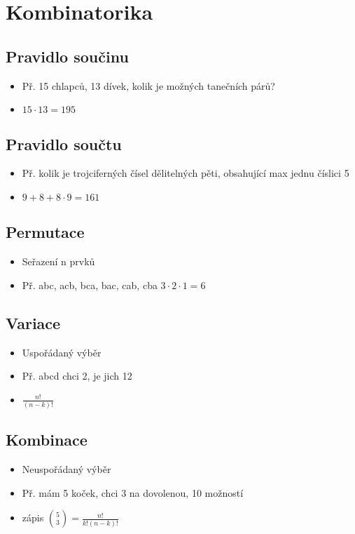 

\section{Kombinatorika} 
    \subsection{Pravidlo součinu} 
    \begin{itemize}
        \item Př. 15 chlapců, 13 dívek, kolik je možných tanečních párů?
        \item $15\cdot 13=195$
    \end{itemize}
    \subsection{Pravidlo součtu}
    \begin{itemize}
        \item Př. kolik je trojciferných čísel dělitelných pěti, obsahující 
        max jednu číslici 5
        \item $9+8+8\cdot 9 = 161$
    \end{itemize}
    \subsection{Permutace}
        \begin{itemize}
            \item Seřazení n prvků
            \item Př. abc, acb, bca, bac, cab, cba  $3\cdot 2\cdot 1=6$
        \end{itemize}
    \subsection{Variace}
        \begin{itemize}
            \item Uspořádaný výběr
            \item Př. abcd chci 2, je jich 12
            \item $\frac{n!}{(n-k)!}$
        \end{itemize}
    \subsection{Kombinace}
        \begin{itemize}
            \item Neuspořádaný výběr
            \item Př. mám 5 koček, chci 3 na dovolenou, 10 možností
            \item zápis ${5\choose 3}=\frac{n!}{k!(n-k)!}$
        \end{itemize}
